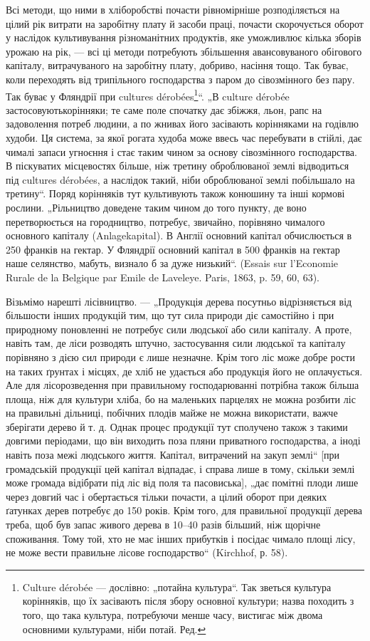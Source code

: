 Всі методи, що ними в хліборобстві почасти рівномірніше розподіляється на цілий рік витрати на
заробітну плату й засоби праці, почасти скорочується оборот у наслідок культивування різноманітних
продуктів, яке уможливлює кілька зборів урожаю на рік, — всі ці методи потребують збільшення
авансовуваного обігового капіталу, витрачуваного на заробітну плату, добриво, насіння тощо. Так
буває, коли переходять від трипільного господарства з паром до сівозмінного без пару. Так буває у
Фляндрії при cultures dérobées\footnote*{
Culture dérobée — дослівно: „потайна культура“. Так зветься культура корінняків, що їх засівають
після збору основної культури; назва походить з того, що така культура, потребуючи менше часу,
вистигає між двома основними культурами, ніби потай. Ред.
}“. „В culture dérobée застосовуютькорінняки; те саме поле спочатку
дає збіжжя, льон, рапс на задоволення потреб людини,
а по жнивах його засівають корінняками на годівлю худоби. Ця система, за якої рогата худоба
може ввесь час перебувати в стійлі, дає чималі запаси угноєння і стає таким чином за основу
сівозмінного господарства. В піскуватих місцевостях більше, ніж третину оброблюваної землі
відводиться під cultures dérobées, а наслідок такий, ніби оброблюваної землі побільшало на третину“.
Поряд корінняків тут культивують також конюшину та інші кормові рослини. „Рільництво доведене таким
чином до того пункту, де воно перетворюється на городництво, потребує, звичайно, порівняно чималого
основного капіталу (Anlagekapital). В Англії основний капітал обчислюється в 250 франків на гектар.
У Фляндрії основний капітал в 500 франків на гектар наше селянство, мабуть, визнало б за дуже
низький“. (Essais sur l’Economie Rurale de la Belgique par Emile de Laveleye. Paris, 1863, p. 59,
60, 63).

Візьмімо нарешті лісівництво. — „Продукція дерева посутньо відрізняється від більшости інших
продукцій тим, що тут сила природи діє самостійно і при природному поновленні не потребує сили
людської або сили капіталу. А проте, навіть там, де ліси розводять штучно, застосування сили
людської та капіталу порівняно з дією сил природи є лише незначне. Крім того ліс може добре рости на
таких ґрунтах і місцях, де хліб не удається або продукція його не оплачується. Але для
лісорозведення при правильному господарюванні потрібна також більша площа, ніж для культури хліба,
бо на маленьких парцелях не можна розбити ліс на правильні дільниці, побічних плодів майже не можна
використати, важче зберігати дерево й т. д. Однак процес продукції тут сполучено також з такими
довгими періодами, що він виходить поза пляни приватного господарства, а іноді навіть поза межі
людського життя. Капітал,
витрачений на закуп землі“ [при громадській продукції цей капітал відпадає, і справа лише в тому,
скільки землі може громада відібрати під ліс від поля та пасовиська], „дає помітні плоди лише через
довгий час і обертається тільки почасти, а цілий оборот при деяких ґатунках дерев потребує до 150
років. Крім того, для правильної продукції дерева треба, щоб був запас живого дерева в 10–40 разів
більший, ніж щорічне споживання. Тому той, хто не має інших прибутків і посідає чимало площі лісу,
не може вести правильне лісове господарство“ (Kirchhof, р. 58).

